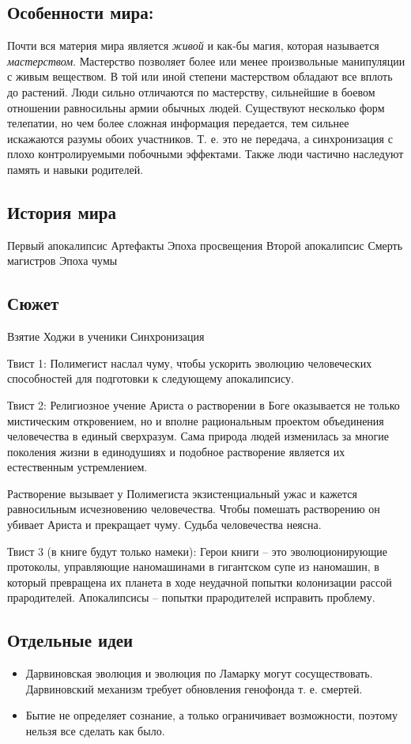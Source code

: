 \documentclass[12pt,a4paper]{article}
\begin{document}
\thispagestyle{empty}

\subsection*{Особенности мира:}

Почти вся материя мира является \textit{живой} и как-бы магия, которая называется \textit{мастерством}. Мастерство позволяет более или менее произвольные манипуляции с живым веществом. В той или иной степени мастерством обладают все вплоть до растений. Люди сильно отличаются по мастерству, сильнейшие в боевом отношении равносильны армии обычных людей.
Существуют несколько форм телепатии, но чем более сложная информация передается, тем сильнее искажаются разумы обоих участников. Т. е. это не передача, а синхронизация с плохо контролируемыми побочными эффектами.
Также люди частично наследуют память и навыки родителей.


\subsection*{История мира}
Первый апокалипсис
Артефакты
Эпоха просвещения
Второй апокалипсис
Смерть магистров
Эпоха чумы

\subsection*{Сюжет}

Взятие Ходжи в ученики
Синхронизация

Твист 1: Полимегист наслал чуму, чтобы ускорить эволюцию человеческих способностей для подготовки к следующему апокалипсису.

Твист 2: Религиозное учение Ариста о растворении в Боге оказывается не только мистическим откровением, но и вполне рациональным проектом объединения человечества в единый сверхразум. Сама природа людей изменилась за многие поколения жизни в единодушиях и подобное растворение является их естественным устремлением.

Растворение вызывает у Полимегиста экзистенциальный ужас и кажется равносильным исчезновению человечества. Чтобы помешать растворению он убивает Ариста и прекращает чуму. Судьба человечества неясна.

Твист 3 (в книге будут только намеки): Герои книги -- это эволюционирующие протоколы, управляющие наномашинами в гигантском супе из наномашин, в который превращена их планета в ходе неудачной попытки колонизации рассой прародителей. Апокалипсисы -- попытки прародителей исправить проблему.

\subsection*{Отдельные идеи}
\begin{itemize}
\item Дарвиновская эволюция и эволюция по Ламарку могут сосуществовать. Дарвиновский механизм требует обновления генофонда т. е. смертей.
\item Бытие не определяет сознание, а только ограничивает возможности, поэтому нельзя все сделать как было.
\end{itemize}
\end{document}
